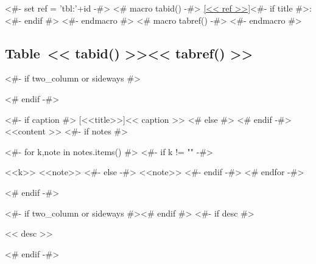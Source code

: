 <#- set ref = 'tbl:'+id -#>
<# macro tabid() -#>
\ref{<< ref >>}<#- if title #>: <#- endif #>
<#- endmacro #>
<# macro tabref() -#>
\color{light-gray}
<#- endmacro #>

\begin{samepage}
\subsection[Table~~~<< tabid() >>~~~<< tabref() >>]{Table~<< tabid() >>\hfill<< tabref() >>}
\nopagebreak
<#- if two_column or sideways #>
\begin{adjustbox}{width=\textwidth,center}
<# endif -#>
\begin{threeparttable}
  <#- if caption #>
  [<<title>>]{<< caption >>}
  <# else #>
  <# endif -#>\label{<< ref >>}
  <<content >>
  <#- if notes #>
  \begin{tablenotes}
    <#- for k,note in notes.items() #>
    <#- if k != "" -#>
    \item [<<k>>] <<note>>
    <#- else -#>
    <<note>>
    <#- endif -#>
    <# endfor -#>
  \end{tablenotes}
  <# endif -#>
\end{threeparttable}
<#- if two_column or sideways #>\end{adjustbox}<# endif #>
<#- if desc #>
\nopagebreak
\begin{figinfo}<< desc >>\end{figinfo}
<# endif -#>
\end{samepage}
\vspace{20pt}

